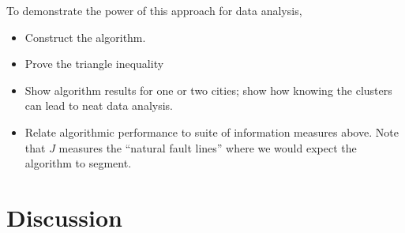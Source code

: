 \documentclass[english]{scrartcl}
\begin{document}
	To demonstrate the power of this approach for data analysis, 



	\begin{itemize}
		\item Construct the algorithm. 
		\item Prove the triangle inequality
		\item Show algorithm results for one or two cities; show how knowing the clusters can lead to neat data analysis. 
		\item Relate algorithmic performance to suite of information measures above. Note that $J$ measures the ``natural fault lines'' where we would expect the algorithm to segment.  
	\end{itemize}

\section{Discussion} \label{sec:discussion}

{}




\end{document}
